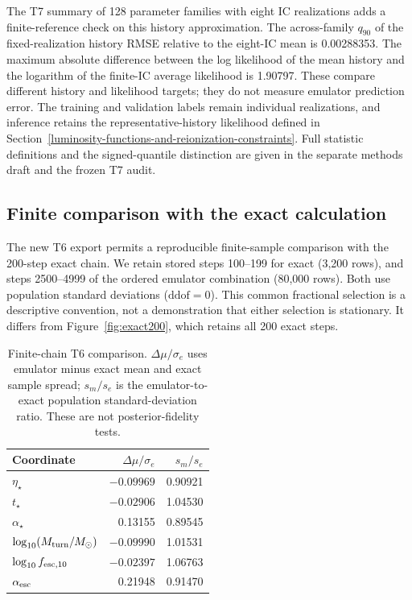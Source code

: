 The T7 summary of 128 parameter families with eight IC realizations adds a finite-reference check on this history approximation. The across-family $q_{90}$ of the fixed-realization history RMSE relative to the eight-IC mean is 0.00288353. The maximum absolute difference between the log likelihood of the mean history and the logarithm of the finite-IC average likelihood is 1.90797. These compare different history and likelihood targets; they do not measure emulator prediction error. The training and validation labels remain individual realizations, and inference retains the representative-history likelihood defined in Section~\ref{luminosity-functions-and-reionization-constraints}. Full statistic definitions and the signed-quantile distinction are given in the separate methods draft and the frozen T7 audit.

\subsection{Finite comparison with the exact calculation}

The new T6 export permits a reproducible finite-sample comparison with the 200-step exact chain. We retain stored steps 100--199 for exact (3,200 rows), and steps 2500--4999 of the ordered emulator combination (80,000 rows). Both use population standard deviations ($\mathrm{ddof}=0$). This common fractional selection is a descriptive convention, not a demonstration that either selection is stationary. It differs from Figure~\ref{fig:exact200}, which retains all 200 exact steps.

\begin{table}[t]\centering\small
\caption{Finite-chain T6 comparison. $\Delta\mu/\sigma_e$ uses emulator minus exact mean and exact sample spread; $s_m/s_e$ is the emulator-to-exact population standard-deviation ratio. These are not posterior-fidelity tests.}\label{tab:t6}
\begin{tabular}{lrr}\toprule
Coordinate & $\Delta\mu/\sigma_e$ & $s_m/s_e$\\\midrule
$\eta_\star$ & $-0.09969$ & 0.90921\\
$t_\star$ & $-0.02906$ & 1.04530\\
$\alpha_\star$ & 0.13155 & 0.89545\\
$\log_{10}(M_{\rm turn}/M_\odot)$ & $-0.09990$ & 1.01531\\
$\log_{10}f_{{\rm esc},10}$ & $-0.02397$ & 1.06763\\
$\alpha_{\rm esc}$ & 0.21948 & 0.91470\\\bottomrule
\end{tabular}\end{table}

